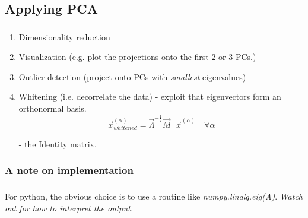 \subsection{Applying PCA}



\begin{frame}\frametitle{\subsecname}

\begin{enumerate}
\item Dimensionality reduction
\item Visualization (e.g. plot the projections onto the first 2 or 3 PCs.)
\item Outlier detection (project onto PCs with \emph{smallest} eigenvalues)
\item Whitening (i.e. decorrelate the data) - exploit that eigenvectors form an orthonormal basis.
\begin{equation}
\vec x_{whitened}^{(\alpha)} = \vec{\Lambda}^{-\frac{1}{2}}\vec{M}^\top\vec{x}^{(\alpha)}
\quad
\forall \alpha
\end{equation}


\pause

- the Identity matrix.

\end{enumerate}

\end{frame}

\newpage


\subsubsection{A note on implementation}

\begin{frame}\frametitle{\subsubsecname}


\pause
{}
\pause

For python, the obvious choice is to use a routine like \textit{numpy.linalg.eig(A)}. \emph{Watch out for how to interpret the output.}

\end{frame}

